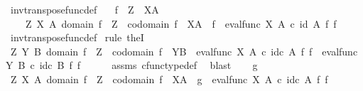 \begin{isabellebody}
\isanewline
{}\isamarkupfalse%
\ inv{\isacharunderscore}{\kern0pt}transpose{\isacharunderscore}{\kern0pt}func{\isacharunderscore}{\kern0pt}def{}{\isacharcolon}{\kern0pt}\isanewline
\ \ \ {\isachardoublequoteopen}f\ {\isacharcolon}{\kern0pt}\ Z\ {\isasymrightarrow}\ X\isactrlbsup A\isactrlesup {\isachardoublequoteclose}\isanewline
\ \ \ {\isachardoublequoteopen}{\isasymexists}\ Z\ X\ A{\isachardot}{\kern0pt}\ domain\ f\ {\isacharequal}{\kern0pt}\ Z\ {\isasymand}\ codomain\ f\ {\isacharequal}{\kern0pt}\ X\isactrlbsup A\isactrlesup \ {\isasymand}\ f\isactrlsup {\isasymflat}\ {\isacharequal}{\kern0pt}\ {\isacharparenleft}{\kern0pt}eval{\isacharunderscore}{\kern0pt}func\ X\ A{\isacharparenright}{\kern0pt}\ {\isasymcirc}\isactrlsub c\ {\isacharparenleft}{\kern0pt}id\ A\ {\isasymtimes}\isactrlsub f\ f{\isacharparenright}{\kern0pt}{\isachardoublequoteclose}\isanewline
%
\isadelimproof
\ \ %
\endisadelimproof
%
\isatagproof
{}\isamarkupfalse%
\ inv{\isacharunderscore}{\kern0pt}transpose{\isacharunderscore}{\kern0pt}func{\isacharunderscore}{\kern0pt}def\isanewline
{}\isamarkupfalse%
\ {\isacharparenleft}{\kern0pt}rule\ theI{\isacharparenright}{\kern0pt}\isanewline
\ \ \isamarkupfalse%
\ {\isachardoublequoteopen}{\isasymexists}Z\ Y\ B{\isachardot}{\kern0pt}\ domain\ f\ {\isacharequal}{\kern0pt}\ Z\ {\isasymand}\ codomain\ f\ {\isacharequal}{\kern0pt}\ Y\isactrlbsup B\isactrlesup \ {\isasymand}\ eval{\isacharunderscore}{\kern0pt}func\ X\ A\ {\isasymcirc}\isactrlsub c\ id\isactrlsub c\ A\ {\isasymtimes}\isactrlsub f\ f\ {\isacharequal}{\kern0pt}\ eval{\isacharunderscore}{\kern0pt}func\ Y\ B\ {\isasymcirc}\isactrlsub c\ id\isactrlsub c\ B\ {\isasymtimes}\isactrlsub f\ f{\isachardoublequoteclose}\isanewline
\ \ \ \ \isamarkupfalse%
\ assms\ cfunc{\isacharunderscore}{\kern0pt}type{\isacharunderscore}{\kern0pt}def\ \isamarkupfalse%
\ blast\isanewline
{}\isamarkupfalse%
\isanewline
\ \ \isamarkupfalse%
\ g\isanewline
\ \ \isamarkupfalse%
\ {\isachardoublequoteopen}{\isasymexists}Z\ X\ A{\isachardot}{\kern0pt}\ domain\ f\ {\isacharequal}{\kern0pt}\ Z\ {\isasymand}\ codomain\ f\ {\isacharequal}{\kern0pt}\ X\isactrlbsup A\isactrlesup \ {\isasymand}\ g\ {\isacharequal}{\kern0pt}\ eval{\isacharunderscore}{\kern0pt}func\ X\ A\ {\isasymcirc}\isactrlsub c\ id\isactrlsub c\ A\ {\isasymtimes}\isactrlsub f\ f{\isachardoublequoteclose}\isanewline
\ \ \isamarkupfalse%
\ \isamarkupfalse%

\end{isabellebody}
